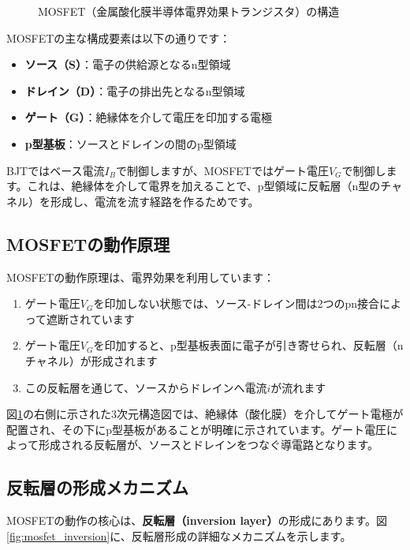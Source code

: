 \begin{figure}[H]
\centering
{}
\caption{MOSFET（金属酸化膜半導体電界効果トランジスタ）の構造}
\label{fig:mosfet_structure}
\end{figure}

MOSFETの主な構成要素は以下の通りです：

\begin{itemize}
\item \textbf{ソース（S）}：電子の供給源となるn型領域
\item \textbf{ドレイン（D）}：電子の排出先となるn型領域
\item \textbf{ゲート（G）}：絶縁体を介して電圧を印加する電極
\item \textbf{p型基板}：ソースとドレインの間のp型領域
\end{itemize}

BJTではベース電流$I_B$で制御しますが、MOSFETではゲート電圧$V_G$で制御します。これは、絶縁体を介して電界を加えることで、p型領域に反転層（n型のチャネル）を形成し、電流を流す経路を作るためです。

\subsection{MOSFETの動作原理}

MOSFETの動作原理は、電界効果を利用しています：

\begin{enumerate}
\item ゲート電圧$V_G$を印加しない状態では、ソース-ドレイン間は2つのpn接合によって遮断されています
\item ゲート電圧$V_G$を印加すると、p型基板表面に電子が引き寄せられ、反転層（nチャネル）が形成されます
\item この反転層を通じて、ソースからドレインへ電流$i$が流れます
\end{enumerate}

図\ref{fig:mosfet_structure}の右側に示された3次元構造図では、絶縁体（酸化膜）を介してゲート電極が配置され、その下にp型基板があることが明確に示されています。ゲート電圧によって形成される反転層が、ソースとドレインをつなぐ導電路となります。

\subsection{反転層の形成メカニズム}

MOSFETの動作の核心は、\textbf{反転層（inversion layer）}の形成にあります。図\ref{fig:mosfet_inversion}に、反転層形成の詳細なメカニズムを示します。

